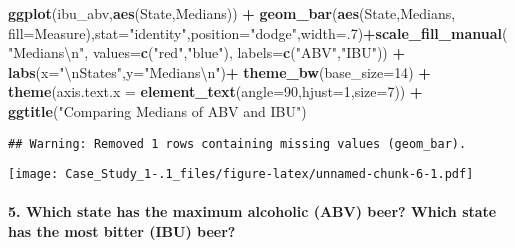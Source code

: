 \documentclass[]{article}
\newenvironment{Shaded}{\begin{snugshade}}{\end{snugshade}}
\newcommand{\CharTok}[1]{\textcolor[rgb]{0.31,0.60,0.02}{#1}}
\newcommand{\DataTypeTok}[1]{\textcolor[rgb]{0.13,0.29,0.53}{#1}}
\newcommand{\DecValTok}[1]{\textcolor[rgb]{0.00,0.00,0.81}{#1}}
\newcommand{\KeywordTok}[1]{\textcolor[rgb]{0.13,0.29,0.53}{\textbf{#1}}}
\newcommand{\NormalTok}[1]{#1}
\newcommand{\OperatorTok}[1]{\textcolor[rgb]{0.81,0.36,0.00}{\textbf{#1}}}
\newcommand{\StringTok}[1]{\textcolor[rgb]{0.31,0.60,0.02}{#1}}
\let\oldparagraph\paragraph
\renewcommand{\paragraph}[1]{\oldparagraph{#1}\mbox{}}
\begin{document}
\begin{Shaded}
\begin{Highlighting}[]
\KeywordTok{ggplot}\NormalTok{(ibu_abv,}\KeywordTok{aes}\NormalTok{(State,Medians)) }\OperatorTok{+}\StringTok{ }\KeywordTok{geom_bar}\NormalTok{(}\KeywordTok{aes}\NormalTok{(State,Medians, }\DataTypeTok{fill=}\NormalTok{Measure),}\DataTypeTok{stat=}\StringTok{"identity"}\NormalTok{,}\DataTypeTok{position=}\StringTok{"dodge"}\NormalTok{,}\DataTypeTok{width=}\NormalTok{.}\DecValTok{7}\NormalTok{)}\OperatorTok{+}\KeywordTok{scale_fill_manual}\NormalTok{(}\StringTok{"Medians}\CharTok{\textbackslash{}n}\StringTok{"}\NormalTok{, }\DataTypeTok{values=}\KeywordTok{c}\NormalTok{(}\StringTok{"red"}\NormalTok{,}\StringTok{"blue"}\NormalTok{), }\DataTypeTok{labels=}\KeywordTok{c}\NormalTok{(}\StringTok{"ABV"}\NormalTok{,}\StringTok{"IBU"}\NormalTok{)) }\OperatorTok{+}\StringTok{ }\KeywordTok{labs}\NormalTok{(}\DataTypeTok{x=}\StringTok{"}\CharTok{\textbackslash{}n}\StringTok{States"}\NormalTok{,}\DataTypeTok{y=}\StringTok{"Medians}\CharTok{\textbackslash{}n}\StringTok{"}\NormalTok{)}\OperatorTok{+}\StringTok{ }\KeywordTok{theme_bw}\NormalTok{(}\DataTypeTok{base_size=}\DecValTok{14}\NormalTok{) }\OperatorTok{+}\StringTok{ }\KeywordTok{theme}\NormalTok{(}\DataTypeTok{axis.text.x =} \KeywordTok{element_text}\NormalTok{(}\DataTypeTok{angle=}\DecValTok{90}\NormalTok{,}\DataTypeTok{hjust=}\DecValTok{1}\NormalTok{,}\DataTypeTok{size=}\DecValTok{7}\NormalTok{)) }\OperatorTok{+}\StringTok{ }\KeywordTok{ggtitle}\NormalTok{(}\StringTok{"Comparing Medians of ABV and IBU"}\NormalTok{) }
\end{Highlighting}
\end{Shaded}

\begin{verbatim}
## Warning: Removed 1 rows containing missing values (geom_bar).
\end{verbatim}

\texttt{[image: Case\_Study\_1-.1\_files/figure-latex/unnamed-chunk-6-1.pdf]}

\hypertarget{which-state-has-the-maximum-alcoholic-abv-beer-which-state-has-the-most-bitter-ibu-beer}{%
\paragraph{5. Which state has the maximum alcoholic (ABV) beer? Which
state has the most bitter (IBU)
beer?}\label{which-state-has-the-maximum-alcoholic-abv-beer-which-state-has-the-most-bitter-ibu-beer}}
\end{document}
